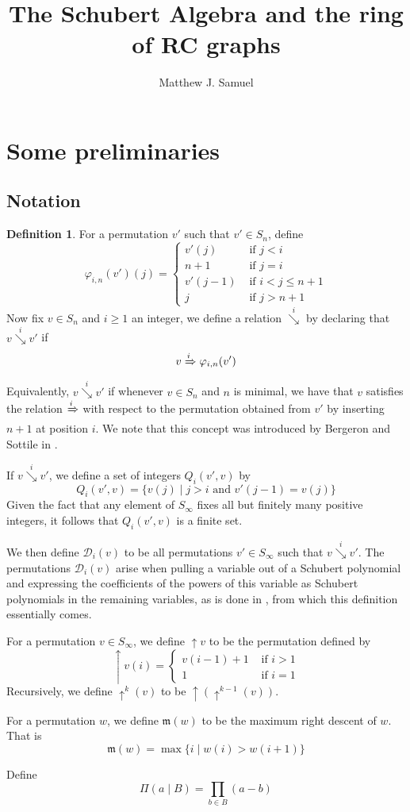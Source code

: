 \documentclass{amsart}
\title{The Schubert Algebra and the ring of RC graphs}
\author{Matthew J. Samuel}
\theoremstyle{definition}
\newtheorem{definition}[lemma]{Definition}
\theoremstyle{remark}
\numberwithin{equation}{subsection}
\newcommand{\shup}{{\uparrow}}
\newcommand{\downvar}[1]{\stackrel{#1}{\searrow}}
\newcommand{\Tom}[1]{\xRightarrow{#1}}
\newcommand{\smpfu}{\mathsf{\Pi}}
\newcommand{\smpre}[2]{\ensuremath{}\smpfu\left( #1 \mid #2\right)}
\newcommand{\maxd}{\mathfrak{m}}
\begin{document}
	\maketitle
	
\section{Some preliminaries}
\subsection{Notation}
\begin{definition} \label{definition:polysequence}
		For a permutation $v'$ such that $v'\in S_{n}$, define
		$$\varphi_{i,n}(v')(j)=\begin{cases}
			v'(j)&\mbox{ if }j<i\\
			n+1&\mbox{ if }j=i\\
			v'(j-1)&\mbox{ if }i<j\leq n+1\\
			j&\mbox{ if }j>n+1
		\end{cases}$$
		Now fix $v\in S_n$ and $i\geq 1$ an integer, we define a relation $\downvar{i}$ by declaring that $v\downvar{i} v'$ if 
		$$v\Tom{i}\varphi_{i,n}(v')$$
		Equivalently, $v\downvar{i} v'$ if whenever $v\in S_n$ and $n$ is minimal, we have that $v$ satisfies the relation $\Tom{i}$ with respect to the permutation obtained from $v'$ by inserting $n+1$ at position $i$. We note that this concept was introduced by Bergeron and Sottile in \cite{bsskew}.
		
		If $v\downvar{i} v'$, we define a set of integers $Q_i(v',v)$ by
		$$Q_i(v',v)=\{v(j)\mid j>i\mbox{ and }v'(j-1)=v(j)\}$$
		Given the fact that any element of $S_\infty$ fixes all but finitely many positive integers, it follows that $Q_i(v',v)$ is a finite set.
		
		We then define $\mathcal{D}_i(v)$ to be all permutations $v'\in S_\infty$ such that $v\downvar{i} v'$. The permutations $\mathcal{D}_i(v)$ arise when pulling a variable out of a Schubert polynomial and expressing the coefficients of the powers of this variable as Schubert polynomials in the remaining variables, as is done in \cite{coprod}, from which this definition essentially comes.

		For a permutation $v\in S_\infty$, we define $\shup{v}$ to be the permutation defined by
		$$\shup{v}(i) = \begin{cases}
			v(i-1)+1&\mbox{ if }i>1\\
			1&\mbox{ if }i=1
		\end{cases}$$
		Recursively, we define $\shup^k(v)$ to be $\shup(\shup^{k-1}(v))$.

		For a permutation $w$, we define $\maxd(w)$ to be the maximum right descent of $w$. That is
		$$\maxd(w) = \max\{i\mid w(i)>w(i+1)\}$$

		Define
		$$\smpre{a}{B} = \prod_{b\in B}(a-b)$$
	\end{definition}
\end{document}
